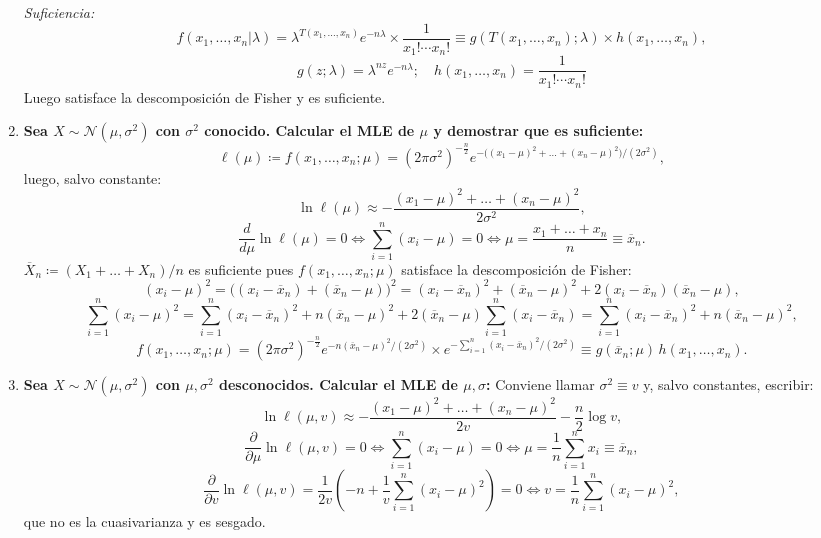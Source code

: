 \begin{enumerate}
  \smallskip
  \noindent\emph{Suficiencia:}
  \[
    f(x_1, \dots, x_n|\lambda) = \lambda^{T(x_1, \dots, x_n)} e^{-n\lambda} \times \frac{1}{x_1!\cdots x_n!} \equiv g(T(x_1, \dots, x_n);\lambda) \times h(x_1, \dots, x_n),
  \]
  $$g(z;\lambda) = \lambda^{nz}e^{-n\lambda}; \quad h(x_1, \dots, x_n) = \frac{1}{x_1!\cdots x_n!}$$ Luego satisface la descomposición de Fisher y es suficiente.

  \item \textbf{Sea $X \sim \mathcal{N}(\mu, \sigma^2)$ con $\sigma^2$ conocido. Calcular el MLE de $\mu$ y demostrar que es suficiente:}
  \[
    \ell(\mu) \coloneqq f(x_1, \dots, x_n;\mu) = (2\pi\sigma^2)^{-\frac{n}{2}} e^{-\bigl((x_1-\mu)^2 + \dots + (x_n-\mu)^2\bigr)/(2\sigma^2)},
  \]
  luego, salvo constante:
  \[
    \ln \ell(\mu) \approx -\frac{(x_1-\mu)^2 + \dots + (x_n-\mu)^2}{2\sigma^2},
  \]
  \[
    \frac{d}{d\mu}\ln \ell(\mu) = 0 \iff \sum_{i=1}^n (x_i - \mu) = 0 \iff \mu = \frac{x_1 + \dots + x_n}{n} \equiv \overline{x}_n.
  \]
  $\overline{X}_n \coloneqq (X_1 + \dots + X_n)/n$ es suficiente pues $f(x_1, \dots, x_n;\mu)$ satisface la descomposición de Fisher:
  \[
    (x_i - \mu)^2 = \bigl((x_i - \overline{x}_n) + (\overline{x}_n - \mu)\bigr)^2 = (x_i - \overline{x}_n)^2 + (\overline{x}_n - \mu)^2 + 2(x_i - \overline{x}_n)(\overline{x}_n - \mu),
  \]
  \[
    \sum_{i=1}^n (x_i - \mu)^2 = \sum_{i=1}^n (x_i - \overline{x}_n)^2 + n(\overline{x}_n - \mu)^2 + 2(\overline{x}_n - \mu)\sum_{i=1}^n (x_i - \overline{x}_n) = \sum_{i=1}^n (x_i - \overline{x}_n)^2 + n(\overline{x}_n - \mu)^2,
  \]
  \[
    f(x_1, \dots, x_n;\mu) = (2\pi\sigma^2)^{-\frac{n}{2}} e^{-n(\overline{x}_n - \mu)^2/(2\sigma^2)} \times e^{-\sum_{i=1}^n (x_i - \overline{x}_n)^2/(2\sigma^2)} \equiv g(\overline{x}_n;\mu)\,h(x_1, \dots, x_n).
  \]

  \item \textbf{Sea $X \sim \mathcal{N}(\mu, \sigma^2)$ con $\mu, \sigma^2$ desconocidos. Calcular el MLE de $\mu, \sigma$:}
  Conviene llamar $\sigma^2 \equiv v$ y, salvo constantes, escribir:
  \[
    \ln \ell(\mu, v) \approx -\frac{(x_1-\mu)^2 + \dots + (x_n-\mu)^2}{2v} - \frac{n}{2}\log v,
  \]
  \[
    \frac{\partial}{\partial\mu}\ln \ell(\mu, v) = 0 \iff \sum_{i=1}^n (x_i - \mu) = 0 \iff \mu = \frac{1}{n}\sum_{i=1}^n x_i \equiv \overline{x}_n,
  \]
  \[
    \frac{\partial}{\partial v}\ln \ell(\mu, v) = \frac{1}{2v}\left(-n + \frac{1}{v}\sum_{i=1}^n (x_i - \mu)^2\right) = 0 \iff v = \frac{1}{n}\sum_{i=1}^n (x_i - \mu)^2,
  \]
  que no es la cuasivarianza y es sesgado.


\end{enumerate}

